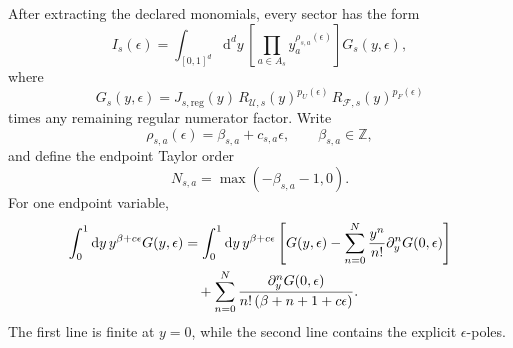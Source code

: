 \documentclass[11pt]{article}
\newcommand{\dd}{\mathrm d}
\newcommand{\eps}{\epsilon}
\newcommand{\U}{\mathcal U}
\newcommand{\F}{\mathcal F}
\begin{document}
After extracting the declared monomials, every sector has the form
\begin{equation}
  I_s(\eps)
  =
  \int_{[0,1]^d}\dd^d y\,
  \left[
    \prod_{a\in A_s}y_a^{\rho_{s,a}(\eps)}
  \right]
  G_s(y,\eps),
\end{equation}
where
\begin{equation}
  G_s(y,\eps)
  =
  J_{s,\mathrm{reg}}(y)\,
  R_{\U,s}(y)^{p_U(\eps)}\,
  R_{\F,s}(y)^{p_F(\eps)}
\end{equation}
times any remaining regular numerator factor.  Write
\begin{equation}
  \rho_{s,a}(\eps)=\beta_{s,a}+c_{s,a}\eps,
  \qquad
  \beta_{s,a}\in\mathbb Z,
\end{equation}
and define the endpoint Taylor order
\begin{equation}
  N_{s,a}=\max(-\beta_{s,a}-1,0).
\end{equation}
For one endpoint variable,
\begin{align}
  \int_0^1\dd y\,y^{\beta+c\eps}G(y,\eps)
  &=
  \int_0^1\dd y\,y^{\beta+c\eps}
  \left[
    G(y,\eps)
    -
    \sum_{n=0}^{N}
    \frac{y^n}{n!}
    \partial_y^nG(0,\eps)
  \right]
  \notag\\
  &\quad+
  \sum_{n=0}^{N}
  \frac{\partial_y^nG(0,\eps)}
       {n!\,(\beta+n+1+c\eps)} .
\end{align}
The first line is finite at \(y=0\), while the second line contains the
explicit \(\eps\)-poles.
\end{document}
